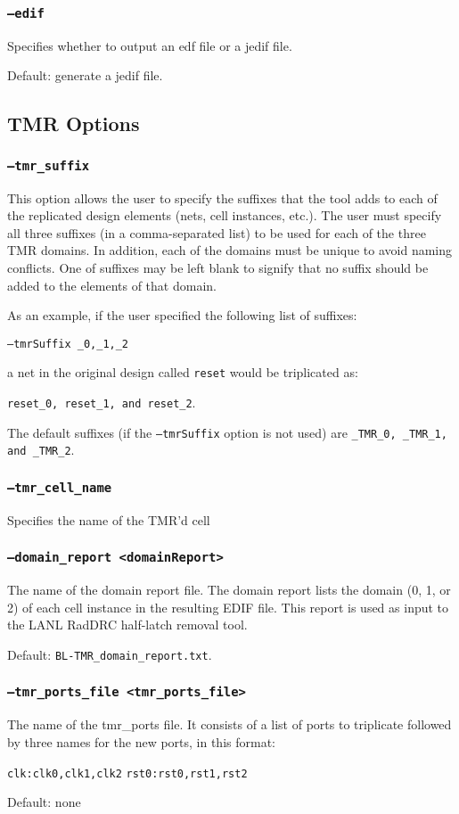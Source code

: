 \subsubsection{\texttt{--edif}}
Specifies whether to output an edf file or a jedif file.

Default: generate a jedif file.

\subsection{TMR Options}
\subsubsection{\texttt{--tmr\_suffix}}
This option allows the user to specify the suffixes that the tool adds to each
of the replicated design elements (nets, cell instances, etc.). The user must
specify all three suffixes (in a comma-separated list) to be used for each of
the three TMR domains. In addition, each of the domains must be unique to avoid
naming conflicts. One of suffixes may be left blank to signify that no suffix
should be added to the elements of that domain.

As an example, if the user specified the following list of suffixes:

\texttt{--tmrSuffix \_0,\_1,\_2}

a net in the original design called \texttt{reset} would be triplicated as:

\texttt{reset\_0, reset\_1, and reset\_2}.

The default suffixes (if the \texttt{--tmrSuffix} option is not used) are 
\texttt{\_TMR\_0, \_TMR\_1, and \_TMR\_2}.

\subsubsection{\texttt{--tmr\_cell\_name}}
 Specifies the name of the TMR'd cell


\subsubsection{\texttt{--domain\_report <domainReport>}}
The name of the domain report file. The domain report lists the domain (0, 1, 
or 2) of each cell instance in the resulting EDIF file. This report is used as 
input to the LANL RadDRC half-latch removal tool. 

Default: \texttt{BL-TMR\_domain\_report.txt}.

\subsubsection{\texttt{--tmr\_ports\_file <tmr\_ports\_file>}}
The name of the tmr\_ports file. It consists of a list of ports to
triplicate followed by three names for the new ports, in this format:

\texttt{clk:clk0,clk1,clk2}
\texttt{rst0:rst0,rst1,rst2}

Default: none




